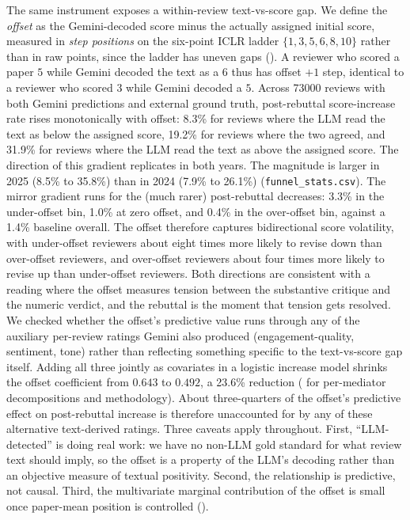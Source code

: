 \documentclass{article}
\newcommand{\code}[1]{\texttt{#1}}
\begin{document}
The same instrument exposes a within-review text-vs-score gap. We define the \emph{offset} as the Gemini-decoded score minus the actually assigned initial score, measured in \emph{step positions} on the six-point ICLR ladder $\{1, 3, 5, 6, 8, 10\}$ rather than in raw points, since the ladder has uneven gaps (). A reviewer who scored a paper $5$ while Gemini decoded the text as a $6$ thus has offset $+1$ step, identical to a reviewer who scored $3$ while Gemini decoded a $5$. Across \num{73000} reviews with both Gemini predictions and external ground truth, post-rebuttal score-increase rate rises monotonically with offset: 8.3\% for reviews where the LLM read the text as below the assigned score, 19.2\% for reviews where the two agreed, and 31.9\% for reviews where the LLM read the text as above the assigned score. The direction of this gradient replicates in both years. The magnitude is larger in 2025 (8.5\% to 35.8\%) than in 2024 (7.9\% to 26.1\%) (\code{funnel\_stats.csv}). The mirror gradient runs for the (much rarer) post-rebuttal decreases: 3.3\% in the under-offset bin, 1.0\% at zero offset, and 0.4\% in the over-offset bin, against a 1.4\% baseline overall. The offset therefore captures bidirectional score volatility, with under-offset reviewers about eight times more likely to revise down than over-offset reviewers, and over-offset reviewers about four times more likely to revise up than under-offset reviewers. Both directions are consistent with a reading where the offset measures tension between the substantive critique and the numeric verdict, and the rebuttal is the moment that tension gets resolved. We checked whether the offset's predictive value runs through any of the auxiliary per-review ratings Gemini also produced (engagement-quality, sentiment, tone) rather than reflecting something specific to the text-vs-score gap itself. Adding all three jointly as covariates in a logistic increase model shrinks the offset coefficient from $0.643$ to $0.492$, a 23.6\% reduction ( for per-mediator decompositions and methodology). About three-quarters of the offset's predictive effect on post-rebuttal increase is therefore unaccounted for by any of these alternative text-derived ratings. Three caveats apply throughout. First, ``LLM-detected'' is doing real work: we have no non-LLM gold standard for what review text should imply, so the offset is a property of the LLM's decoding rather than an objective measure of textual positivity. Second, the relationship is predictive, not causal. Third, the multivariate marginal contribution of the offset is small once paper-mean position is controlled ().
\end{document}
